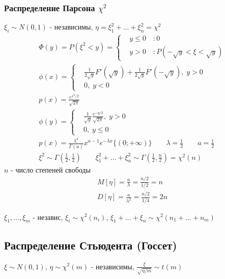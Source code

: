 \documentclass{article}
\begin{document}
\subsubsection[Распределение Парсона]{Распределение Парсона $\chi^2$}
$\xi_i\sim N(0,1)$ - независимы, $\eta=\xi_1^2+\dots+\xi_n^2=\chi^2$
\begin{gather*}
  \Phi(y)=P(\xi^2<y)=\left\{\begin{aligned}
    & y\le0 \quad :0 \\
    & y > 0 \quad :P(-\sqrt{y}<\xi<\sqrt{y})
  \end{aligned}\right. \\
  \phi(x)=   \left\{\begin{aligned}
      & \frac{1}{2\sqrt{y}}F'(\sqrt{y})+\frac{1}{2\sqrt{y}}F'(-\sqrt{y}), \; y> 0 \\
      & 0, \; y<0
    \end{aligned}\right. \\
  p(x)=\frac{e^{x^2/2}}{\sqrt{2\pi}} \\
  \phi(y)=\left\{\begin{aligned}
    & \frac{1}{\sqrt{y}}\frac{e^{-y/2}}{\sqrt{2\pi}}, \; y>0  \\
    & 0, \; y\le 0
  \end{aligned}\right. \\
  p(x)=\frac{\lambda^{a}}{\Gamma(a)}x^{a-1}e^{-\lambda x}\{(0;+\infty)\} \qquad \lambda=\frac{1}{2} \qquad a=\frac{1}{2} \\
  \xi^{2}\sim \Gamma(\frac{1}{2}, \frac{1}{2}) \qquad \xi_1^{2}+\dots+\xi_n^{2} \sim \Gamma(\frac{1}{2}, \frac{n}{2})=\chi^{2}(n)
\end{gather*}
$n$ - число степеней свободы
\begin{gather*}
  M[\eta]=\frac{a}{\lambda}=\frac{n/2}{1/2}=n \\
  D[\eta]=\frac{a}{\lambda^{2}}=\frac{n/2}{1/4}=2n
\end{gather*}

\begin{theorem}
  $\xi_1,\dots,\xi_m$ - независ, $\xi_i\sim \chi^{2}(n_i)$, $\xi_1+\dots+\xi_n\sim \chi^2(n_1+\dots+n_m)$
\end{theorem}

\subsection{Распределение Стьюдента (Госсет)}
$\xi \sim N(0,1)$, $\eta \sim \chi^2(m)$ - независимы, $\frac{\xi}{\sqrt{\eta/m}}\sim t(m)$
\end{document}
